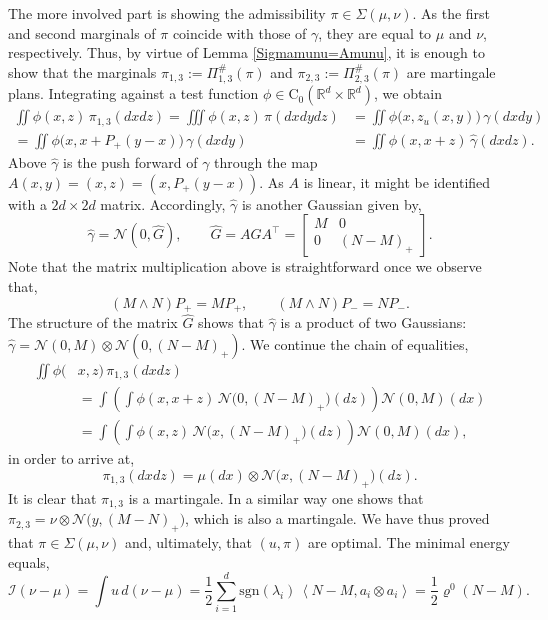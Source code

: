 \documentclass[11pt,letterpaper,reqno]{amsart}
\theoremstyle{definition}
\numberwithin{equation}{section}
\newcommand{\R}{\mathbb{R}}
\newcommand{\Rd}{\R^d}
\newcommand{\pairing}[1]{{\left \langle #1 \right \rangle}}
\begin{document}
{The more involved part is showing the admissibility $\pi \in \Sigma(\mu,\nu)$. As the first and second marginals of $\pi$ coincide with those of $\gamma$, they are equal to $\mu$ and $\nu$, respectively. Thus, by virtue of Lemma \ref{Sigmamunu=Amunu}, it is enough to show that the marginals $\pi_{1,3} := \Pi^\#_{1,3} (\pi)$ and $\pi_{2,3} := \Pi^\#_{2,3} (\pi)$ are martingale plans.
Integrating against a test function $\phi \in \mathrm{C}_0(\Rd \times \Rd)$, we obtain
\begin{align*}
	\iint \phi(x,z) \,\pi_{1,3}(dxdz) = \iiint \phi(x,z) \, \pi(dxdydz) &= \iint \phi\big(x,z_u(x,y)\big) \, \gamma(dxdy) \\
	 = \iint \phi\big(x,x + P_+(y-x)\big) \, \gamma(dxdy) &= \iint \phi(x,x+z)  \,\hat\gamma(dxdz).
\end{align*}
Above $\hat{\gamma}$ is the push forward of $\gamma$ through the map
$A(x,y) = (x,z) = (x, P_+(y-x))$. As $A$ is linear, it might be identified with a $2d \times 2d$ matrix. Accordingly, $\hat{\gamma}$ is another Gaussian given by,
\begin{equation*}
	\hat{\gamma} = \mathcal{N}(0,\hat{G}), \qquad \hat{G} = AGA^\top =  \begin{bmatrix}
		M & 0\\
		0   &(N-M)_+
	\end{bmatrix}.
\end{equation*}
Note that the matrix multiplication above is straightforward once we observe that,
$$(M\wedge N) P_+ = M P_+, \qquad (M\wedge N) P_- = N P_-.$$
 The structure of the matrix $\hat{G}$ shows that $\hat{\gamma}$ is a product of two Gaussians:  $\hat{\gamma} = \mathcal{N}(0,M) \otimes \mathcal{N}(0,(N-M)_+)$. We continue the chain of equalities,
\begin{align*}
	\iint \phi(&x,z) \,\pi_{1,3}(dxdz)\\
	&=  \int \left( \int \phi(x,x+z) \,\mathcal{N}\big(0,(N-M)_+\big)(dz)\right) \mathcal{N}(0,M) (dx) \\
	& =  \int \left( \int \phi(x,z) \,\mathcal{N}\big(x,(N-M)_+\big)(dz)\right) \mathcal{N}(0,M) (dx),
\end{align*}
in order to arrive at,
\begin{equation}\label{pi13}
	\pi_{1,3}(dxdz) = \mu(dx) \otimes \mathcal{N}\big(x,(N-M)_+\big)(dz).
\end{equation}
It is clear that $\pi_{1,3}$ is a martingale. In a similar way one shows that $	\pi_{2,3} = \nu \otimes \mathcal{N}\big(y,(M-N)_+\big)$,
which is also a martingale. We have thus proved that $\pi \in \Sigma(\mu,\nu)$ and, ultimately, that $(u,\pi)$ are optimal. The minimal energy equals,
\begin{equation*}
	\mathcal{I}(\nu - \mu) = \int u\, d(\nu - \mu) = \frac{1}{2} \sum_{i=1}^d \mathrm{sgn}(\lambda_i)\, \pairing{N-M,a_i \otimes a_i}  = \frac{1}{2} \varrho^0(N-M).
\end{equation*}

}
\end{document}
